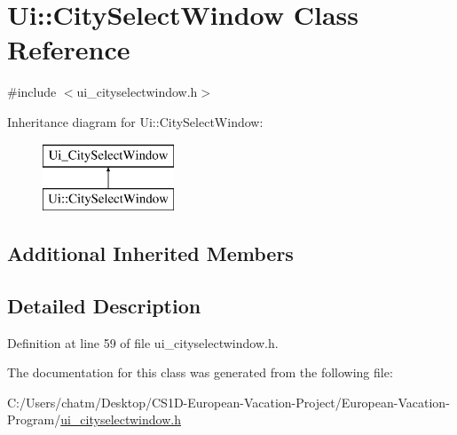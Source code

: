 \hypertarget{class_ui_1_1_city_select_window}{}\section{Ui\+::City\+Select\+Window Class Reference}
\label{class_ui_1_1_city_select_window}


{\ttfamily \#include $<$ui\+\_\+cityselectwindow.\+h$>$}

Inheritance diagram for Ui\+::City\+Select\+Window\+:\begin{figure}[H]
\begin{center}
\leavevmode
\includegraphics[height=2.000000cm]{class_ui_1_1_city_select_window}
\end{center}
\end{figure}
\subsection*{Additional Inherited Members}


\subsection{Detailed Description}


Definition at line 59 of file ui\+\_\+cityselectwindow.\+h.



The documentation for this class was generated from the following file\+:\begin{DoxyCompactItemize}
\item 
C\+:/\+Users/chatm/\+Desktop/\+C\+S1\+D-\/\+European-\/\+Vacation-\/\+Project/\+European-\/\+Vacation-\/\+Program/\mbox{\hyperlink{ui__cityselectwindow_8h}{ui\+\_\+cityselectwindow.\+h}}\end{DoxyCompactItemize}
